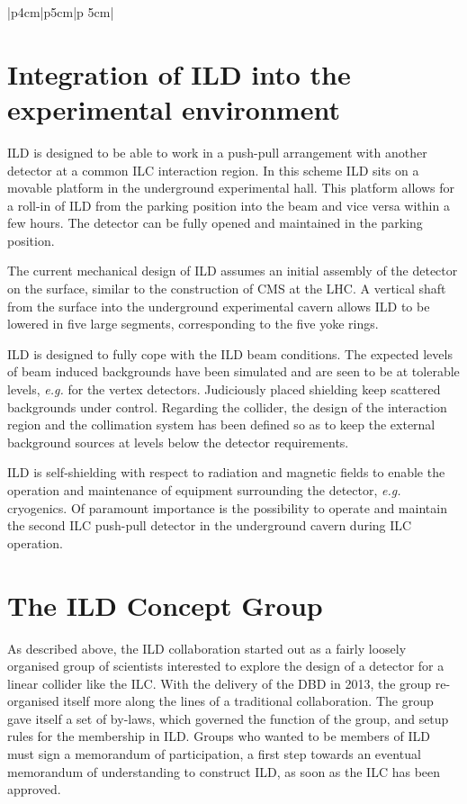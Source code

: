 \documentclass[%
 amsmath,amssymb,
 aps,
 longbibliography,
]{revtex4-1}
\begin{document}
\begin{table}[thb]
\begin{tabular}{|p{4cm}|p{5cm}|p {5cm}|}


    \end{tabular}
    \caption{Table of benchmark reactions which are used by ILD to optimize the detector performance. The analyses are mostly conducted at 500\,GeV centre-of-mass energy, to optimally study the detector sensitivty. The channel, the physics motivation, and the main detector performance parameters are given.}
    \label{tab-benchmark}
\end{table}
\section{Integration of ILD into the experimental environment}
ILD is designed to be able to work in a push-pull arrangement with another detector at a common ILC interaction region. In this scheme ILD sits on a movable platform in the underground experimental hall. This platform allows for a roll-in of ILD from the parking position into the beam and vice versa within a few hours. The detector can be fully opened and maintained in the parking position.

The current mechanical design of ILD assumes an initial assembly of the detector on the surface, similar to the construction of CMS at the LHC. A vertical shaft from the surface into the underground experimental cavern allows ILD to be lowered in five large segments, corresponding to the five yoke rings.

ILD is designed to fully cope with the ILD beam conditions. The expected levels of beam induced backgrounds have been simulated and are seen to be at tolerable levels, {\it e.g.} for the vertex detectors. Judiciously placed shielding keep scattered backgrounds under control. Regarding the collider, the design of the interaction region and the collimation system has been defined so as to keep the external background sources at levels below the detector requirements.

ILD is self-shielding with respect to radiation and magnetic fields to enable the operation and maintenance of equipment surrounding the detector, {\it e.g.} cryogenics. Of paramount importance is the possibility to operate and maintain the second ILC push-pull detector in the underground cavern during ILC operation.

\section{The ILD Concept Group}
As described above, the ILD collaboration started out as a fairly loosely organised group of scientists interested to explore the design of a detector for a linear collider like the ILC. With the delivery of the DBD in 2013, the group re-organised itself more along the lines of a traditional collaboration. The group gave itself a set of by-laws, which governed the function of the group, and setup rules for the membership in ILD. Groups who wanted to be members of ILD must sign a memorandum of participation, a first step towards an eventual memorandum of understanding to construct ILD, as soon as the ILC has been approved. 
\end{document}

